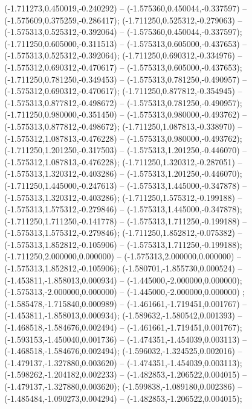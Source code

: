  (-1.711273,0.450019,-0.240292) -- (-1.575360,0.450044,-0.337597) -- (-1.575609,0.375259,-0.286417);
 (-1.711250,0.525312,-0.279063) -- (-1.575313,0.525312,-0.392064) -- (-1.575360,0.450044,-0.337597);
 (-1.711250,0.605000,-0.311513) -- (-1.575313,0.605000,-0.437653) -- (-1.575313,0.525312,-0.392064);
 (-1.711250,0.690312,-0.334976) -- (-1.575312,0.690312,-0.470617) -- (-1.575313,0.605000,-0.437653);
 (-1.711250,0.781250,-0.349453) -- (-1.575313,0.781250,-0.490957) -- (-1.575312,0.690312,-0.470617);
 (-1.711250,0.877812,-0.354945) -- (-1.575313,0.877812,-0.498672) -- (-1.575313,0.781250,-0.490957);
 (-1.711250,0.980000,-0.351450) -- (-1.575313,0.980000,-0.493762) -- (-1.575313,0.877812,-0.498672);
 (-1.711250,1.087813,-0.338970) -- (-1.575312,1.087813,-0.476228) -- (-1.575313,0.980000,-0.493762);
 (-1.711250,1.201250,-0.317503) -- (-1.575313,1.201250,-0.446070) -- (-1.575312,1.087813,-0.476228);
 (-1.711250,1.320312,-0.287051) -- (-1.575313,1.320312,-0.403286) -- (-1.575313,1.201250,-0.446070);
 (-1.711250,1.445000,-0.247613) -- (-1.575313,1.445000,-0.347878) -- (-1.575313,1.320312,-0.403286);
 (-1.711250,1.575312,-0.199188) -- (-1.575313,1.575312,-0.279846) -- (-1.575313,1.445000,-0.347878);
 (-1.711250,1.711250,-0.141778) -- (-1.575313,1.711250,-0.199188) -- (-1.575313,1.575312,-0.279846);
 (-1.711250,1.852812,-0.075382) -- (-1.575313,1.852812,-0.105906) -- (-1.575313,1.711250,-0.199188);
 (-1.711250,2.000000,0.000000) -- (-1.575313,2.000000,0.000000) -- (-1.575313,1.852812,-0.105906);
 (-1.580701,-1.855730,0.000524) -- (-1.453811,-1.858013,0.000934) -- (-1.445000,-2.000000,0.000000);
 (-1.575313,-2.000000,0.000000) -- (-1.445000,-2.000000,0.000000) ;
 (-1.585478,-1.715840,0.000989) -- (-1.461661,-1.719451,0.001767) -- (-1.453811,-1.858013,0.000934);
 (-1.589632,-1.580542,0.001393) -- (-1.468518,-1.584676,0.002494) -- (-1.461661,-1.719451,0.001767);
 (-1.593153,-1.450040,0.001736) -- (-1.474351,-1.454039,0.003113) -- (-1.468518,-1.584676,0.002494);
 (-1.596032,-1.324525,0.002016) -- (-1.479137,-1.327880,0.003620) -- (-1.474351,-1.454039,0.003113);
 (-1.598262,-1.204182,0.002233) -- (-1.482853,-1.206522,0.004015) -- (-1.479137,-1.327880,0.003620);
 (-1.599838,-1.089180,0.002386) -- (-1.485484,-1.090273,0.004294) -- (-1.482853,-1.206522,0.004015);
